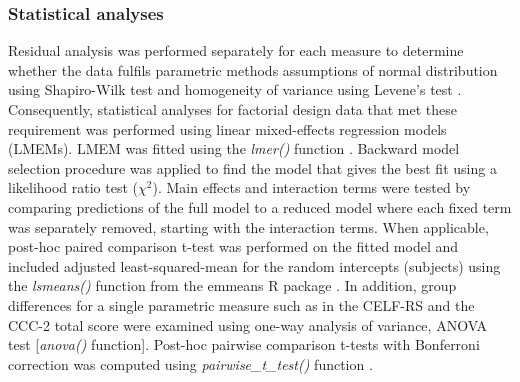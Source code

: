 \documentclass[a4paper, twoside]{templates/ociamthesis}
\begin{document}
\hypertarget{statistical-analyses}{%
\subsubsection{Statistical analyses}\label{statistical-analyses}}

Residual analysis was performed separately for each measure to determine whether the data fulfils parametric methods assumptions of normal distribution using Shapiro-Wilk test \autocite[\emph{shapiro.test()},][]{RCore} and homogeneity of variance using Levene's test \autocite[\emph{leveneTest()};][]{carPackageR}. Consequently, statistical analyses for factorial design data that met these requirement was performed using linear mixed-effects regression models (LMEMs). LMEM was fitted using the \emph{lmer()} function \autocite[lme4 package;][]{lme4PackageR}. Backward model selection procedure was applied to find the model that gives the best fit using a likelihood ratio test (\(\chi^2\)). Main effects and interaction terms were tested by comparing predictions of the full model to a reduced model where each fixed term was separately removed, starting with the interaction terms. When applicable, post-hoc paired comparison t-test was performed on the fitted model and included adjusted least-squared-mean for the random intercepts (subjects) using the \emph{lsmeans()} function from the emmeans R package \autocite{emmeansPackageR}. In addition, group differences for a single parametric measure such as in the CELF-RS and the CCC-2 total score were examined using one-way analysis of variance, ANOVA test {[}\emph{anova()} function{]}. Post-hoc pairwise comparison t-tests with Bonferroni correction was computed using \emph{pairwise\_t\_test()} function \autocite[rstatix package;][]{rstatixPackageR}.\\
\end{document}
